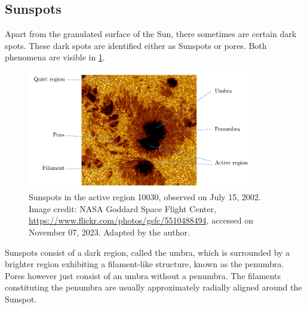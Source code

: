 \documentclass[a4paper,12pt]{report}
\begin{document}
\subsection{Sunspots}
Apart from the granulated surface of the Sun, there sometimes are certain dark spots. These dark spots are identified either as Sunspots or pores. Both phenomena are visible in \cref{fig:Sunspots}.
\begin{figure}[h]
\centering
\includegraphics[width=10cm]{figures/Sunspots.pdf}
\caption{Sunspots in the active region 10030, observed on July 15, 2002. Image credit: NASA Goddard Space Flight Center, \url{https://www.flickr.com/photos/gsfc/5510488494}, accessed on November 07, 2023. Adapted by the author.}
\label{fig:Sunspots}
\end{figure}
Sunspots consist of a dark region, called the umbra, which is surrounded by a brighter region exhibiting a filament-like structure, known as the penumbra. Pores however just consist of an umbra without a penumbra. The filaments constituting the penumbra are usually approximately radially aligned around the Sunspot.
\end{document}
